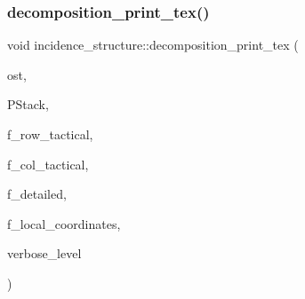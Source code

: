 \subsubsection{\texorpdfstring{decomposition\+\_\+print\+\_\+tex()}{decomposition\_print\_tex()}}
{\footnotesize\ttfamily void incidence\+\_\+structure\+::decomposition\+\_\+print\+\_\+tex (\begin{DoxyParamCaption}\item[{ostream \&}]{ost,  }\item[{\mbox{\hyperlink{classpartitionstack}{partitionstack}} \&}]{P\+Stack,  }\item[{\mbox{\hyperlink{galois_8h_a09fddde158a3a20bd2dcadb609de11dc}{I\+NT}}}]{f\+\_\+row\+\_\+tactical,  }\item[{\mbox{\hyperlink{galois_8h_a09fddde158a3a20bd2dcadb609de11dc}{I\+NT}}}]{f\+\_\+col\+\_\+tactical,  }\item[{\mbox{\hyperlink{galois_8h_a09fddde158a3a20bd2dcadb609de11dc}{I\+NT}}}]{f\+\_\+detailed,  }\item[{\mbox{\hyperlink{galois_8h_a09fddde158a3a20bd2dcadb609de11dc}{I\+NT}}}]{f\+\_\+local\+\_\+coordinates,  }\item[{\mbox{\hyperlink{galois_8h_a09fddde158a3a20bd2dcadb609de11dc}{I\+NT}}}]{verbose\+\_\+level }\end{DoxyParamCaption})}

\mbox{\label{classincidence__structure_a8840e820448ad980279f244a90888b77}} 
